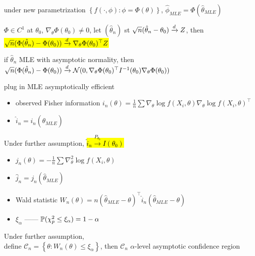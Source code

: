 \begin{fact}
    under new parametrization $\left\{ f(\cdot, \phi) : \phi = \Phi(\theta) \right\}$, $\hat \phi_{MLE} = \Phi (\hat \theta_{MLE})$
\end{fact}

\begin{thm}
    $\Phi \in C^1$ at $\theta_0$, $\nabla_\theta \Phi(\theta_0) \neq 0$, let $(\hat \theta_n)$ st $\sqrt{n}(\hat \theta_n - \theta_0) \xrightarrow{d} Z$, then\\
    \hl{$\sqrt{n} (\Phi(\hat \theta_n) - \Phi(\theta_0)) \xrightarrow{d} \nabla_\theta \Phi(\theta_0)^\top Z$}
\end{thm}

\begin{fact}
    if $\hat \theta_n$ MLE with asymptotic normality, then $\sqrt{n}(\Phi(\hat \theta_n) - \Phi(\theta_0)) \xrightarrow{d} \mathcal{N}(0, \nabla_\theta \Phi(\theta_0)^\top I^{-1}(\theta_0) \nabla_\theta \Phi(\theta_0))$
\end{fact}

\begin{fact}
    plug in MLE asymptotically efficient
\end{fact}

\begin{itemize}
    \item observed Fisher information $i_n(\theta) = \frac{1}{n}\sum \nabla_\theta \log f(X_i, \theta) \nabla_\theta \log f(X_i, \theta)^\top$
    \item $\hat i_n = i_n(\hat \theta_{MLE})$
\end{itemize}

\begin{prop}
    Under further assumption, \hl{$\hat i_n \xrightarrow{P_{\theta_0}} I(\theta_0)$}
\end{prop}

\begin{itemize}
    \item $j_n(\theta) = -\frac{1}{n} \sum \nabla^2_\theta \log f(X_i, \theta)$
    \item $\hat j_n = j_n(\hat \theta_{MLE})$
    \item Wald statistic $W_n(\theta) = n(\hat \theta_{MLE} - \theta)^\top \hat i_n (\hat \theta_{MLE} - \theta)$
    \item $\xi_\alpha$ ------ $\mathbb{P}(\chi_p^2 \leq \xi_\alpha) = 1 - \alpha$
\end{itemize}

\begin{prop}
    Under further assumption,\\ define $\mathcal{C}_n = \left\{ \theta : W_n(\theta) \leq \xi_\alpha \right\}$, then $\mathcal{C}_n$ $\alpha$-level asymptotic confidence region
\end{prop}

